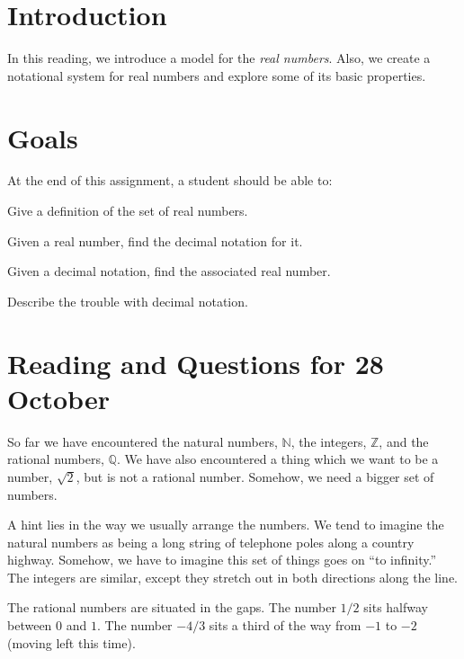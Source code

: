 \documentclass[12pt,letterpaper]{article}
\theoremstyle{definition}
\begin{document}
\setlength{\parskip}{1ex plus 0.5ex minus 0.2ex}
\setlength{\parindent}{0pt}

\pagestyle{fancy}
\cfoot{}

\section*{Introduction}
In this reading, we introduce a model for the \emph{real numbers}. Also, we create a notational system for real numbers and explore some of its basic properties.

\section*{Goals}
At the end of this assignment, a student should be able to:
\begin{compactitem}
\item Give a definition of the set of real numbers.
\item Given a real number, find the decimal notation for it.
\item Given a decimal notation, find the associated real number.
\item Describe the trouble with decimal notation.
\end{compactitem}

\section*{Reading and Questions for 28 October}

So far we have encountered the natural numbers, $\mathbb{N}$, the integers, $\mathbb{Z}$, and the rational numbers, $\mathbb{Q}$. 
We have also encountered a thing which we want to be a number, $\sqrt{2}$, but is not a rational number.
Somehow, we need a bigger set of numbers.

A hint lies in the way we usually arrange the numbers.
We tend to imagine the natural numbers as being a long string of telephone poles along a country highway.
Somehow, we have to imagine this set of things goes on ``to infinity.''
The integers are similar, except they stretch out in both directions along the line.

The rational numbers are situated in the gaps.
The number $1/2$ sits halfway between $0$ and $1$.
The number $-4/3$ sits a third of the way from $-1$ to $-2$ (moving left this time).
\end{document}
